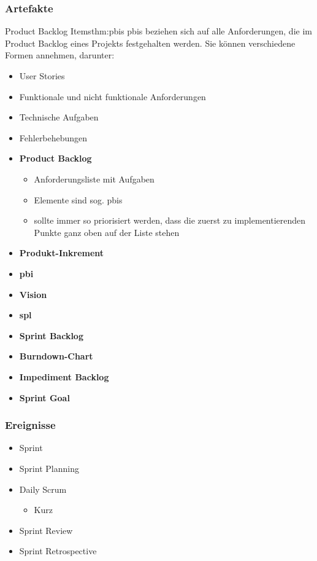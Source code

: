 \documentclass[main.tex]{subfiles}
\begin{document}
\subsubsection*{Artefakte}
\begin{myTheorem}{Product Backlog Items}{thm:pbis}
\glspl{pbi} beziehen sich auf alle Anforderungen, die im Product Backlog eines Projekts festgehalten werden. Sie können verschiedene Formen annehmen, darunter:
\begin{itemize}
    \item User Stories
    \item Funktionale und nicht funktionale Anforderungen
    \item Technische Aufgaben
    \item Fehlerbehebungen
\end{itemize}
\end{myTheorem}
\begin{itemize}
    \item \textbf{Product Backlog}
    \begin{itemize}
        \item Anforderungsliste mit Aufgaben
        \item Elemente sind sog. \glspl{pbi}
        \item sollte immer so priorisiert werden, dass die zuerst zu implementierenden Punkte ganz oben auf der Liste stehen
    \end{itemize}
     \item \textbf{Produkt-Inkrement}
    \item \textbf{\acrlong{pbi}}
    \item \textbf{Vision}
    \item \textbf{\gls{spl}}
    \item \textbf{Sprint Backlog}
    \item \textbf{Burndown-Chart}
    \item \textbf{Impediment Backlog}
    \item \textbf{Sprint Goal }
\end{itemize}
\subsubsection*{Ereignisse}
\begin{itemize}
    \item Sprint
    \item Sprint Planning
    \item Daily Scrum
    \begin{itemize}
        \item Kurz
    \end{itemize}
    \item Sprint Review
    \item Sprint Retrospective
\end{itemize}

\end{document}

